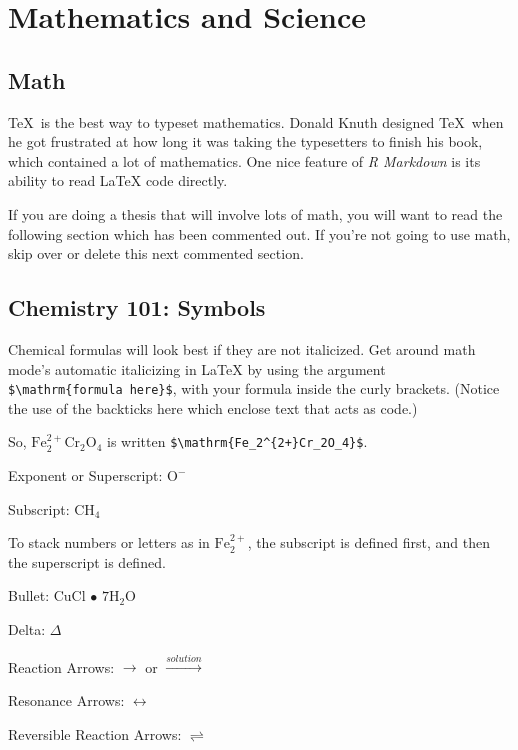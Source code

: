 \documentclass[12pt,twoside]{reedthesis}
\theoremstyle{definition}
\theoremstyle{definition}
\theoremstyle{definition}
\theoremstyle{remark}
\begin{document}
\hypertarget{math-sci}{\chapter{Mathematics and
Science}\label{math-sci}}

\hypertarget{math}{\section{Math}\label{math}}

\TeX~is the best way to typeset mathematics. Donald Knuth designed
\TeX~when he got frustrated at how long it was taking the typesetters to
finish his book, which contained a lot of mathematics. One nice feature
of \emph{R Markdown} is its ability to read LaTeX code directly.

If you are doing a thesis that will involve lots of math, you will want
to read the following section which has been commented out. If you're
not going to use math, skip over or delete this next commented section.

\section{Chemistry 101: Symbols}\label{chemistry-101-symbols}

Chemical formulas will look best if they are not italicized. Get around
math mode's automatic italicizing in LaTeX by using the argument
\texttt{\$\textbackslash{}mathrm\{formula\ here\}\$}, with your formula
inside the curly brackets. (Notice the use of the backticks here which
enclose text that acts as code.)

So, \(\mathrm{Fe_2^{2+}Cr_2O_4}\) is written
\texttt{\$\textbackslash{}mathrm\{Fe\_2\^{}\{2+\}Cr\_2O\_4\}\$}.

\noindent Exponent or Superscript: \(\mathrm{O^-}\)

\noindent Subscript: \(\mathrm{CH_4}\)

To stack numbers or letters as in \(\mathrm{Fe_2^{2+}}\), the subscript
is defined first, and then the superscript is defined.

\noindent Bullet: CuCl \(\bullet\) \(\mathrm{7H_{2}O}\)

\noindent Delta: \(\Delta\)

\noindent Reaction Arrows: \(\longrightarrow\) or
\(\xrightarrow{solution}\)

\noindent Resonance Arrows: \(\leftrightarrow\)

\noindent Reversible Reaction Arrows: \(\rightleftharpoons\)
\end{document}
